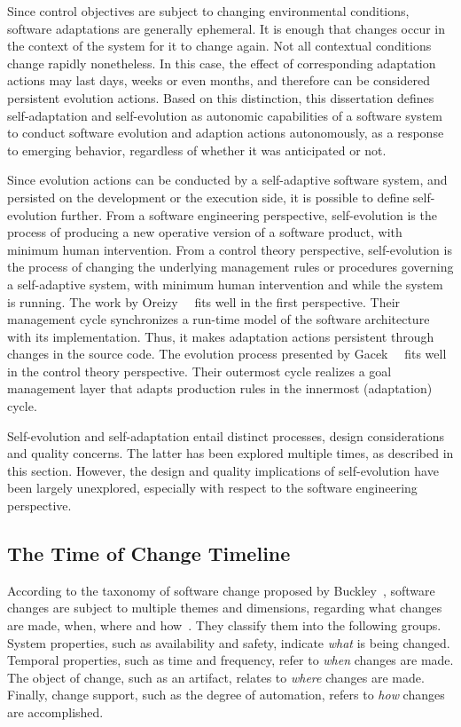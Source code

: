 Since control objectives are subject to changing environmental conditions, software adaptations are generally ephemeral. It is enough that changes occur in the context of the system for it to change again. Not all contextual conditions change rapidly nonetheless. In this case, the effect of corresponding adaptation actions may last days, weeks or even months, and therefore can be considered persistent evolution actions. Based on this distinction, this dissertation defines self-adaptation and self-evolution as autonomic capabilities of a software system to conduct software evolution and adaption actions autonomously, as a response to emerging behavior, regardless of whether it was anticipated or not.

Since evolution actions can be conducted by a self-adaptive software system, and persisted on the development or the execution side, it is possible to define self-evolution further. From a software engineering perspective, self-evolution is the process of producing a new operative version of a software product, with minimum human intervention. From a control theory perspective, self-evolution is the process of changing the underlying management rules or procedures governing a self-adaptive system, with minimum human intervention and while the system is running. The work by Oreizy~\etal{}~\cite{oreizy-1999-architecture} fits well in the first perspective. Their management cycle synchronizes a run-time model of the software architecture with its implementation. Thus, it makes adaptation actions persistent through changes in the source code. The evolution process presented by Gacek~\etal{}~\cite{gacek-2008-friends} fits well in the control theory perspective. Their outermost cycle realizes a goal management layer that adapts production rules in the innermost (adaptation) cycle.

Self-evolution and self-adaptation entail distinct processes, design considerations and quality concerns. The latter has been explored multiple times, as described in this section. However, the design and quality implications of self-evolution have been largely unexplored, especially with respect to the software engineering perspective.

\subsection{The Time of Change Timeline}
\label{subsect:background--time-of-change-timeline}

According to the taxonomy of software change proposed by Buckley~\etal{}, software changes are subject to multiple themes and dimensions, regarding what changes are made, when, where and how~\cite{buckley-2005-towards}. They classify them into the following groups. System properties, such as availability and safety, indicate \emph{what} is being changed. Temporal properties, such as time and frequency, refer to \emph{when} changes are made. The object of change, such as an artifact, relates to \emph{where} changes are made. Finally, change support, such as the degree of automation, refers to \emph{how} changes are accomplished.

